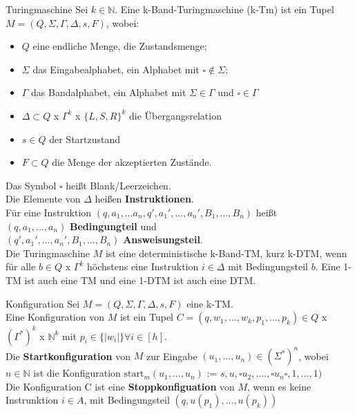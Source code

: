 \begin{defn}{Turingmaschine} 
    Sei $k \in \mathbb{N}$. Eine k-Band-Turingmaschine (k-Tm) ist ein Tupel $M = (Q, \Sigma, \Gamma, \Delta,s,F)$, wobei:
    \begin{itemize}
        \item $Q$ eine endliche Menge, die Zustandsmenge;
        \item $\Sigma$ das Eingabealphabet, ein Alphabet mit $\square \notin \Sigma$;
        \item $\Gamma$ das Bandalphabet, ein Alphabet mit $\Sigma \in \Gamma$ und $\square \in \Gamma$
        \item $\Delta \subset Q$ x $\Gamma^k$ x $\{L,S,R\}^k$ die Übergangsrelation
        \item $s \in Q$ der Startzustand
        \item $F \subset Q$ die Menge der akzeptierten Zustände.
    \end{itemize}

    \vspace{1em}

    Das Symbol $\square$ heißt Blank/Leerzeichen. \\

    Die Elemente von $\Delta$ heißen \textbf{Instruktionen}. \\
    Für eine Instruktion $(q,a_1,...a_n,q',a_1',...,a_n',B_1,...,B_n)$ heißt \\
    $(q,a_1,...,a_n)$ \textbf{Bedingungteil} und \\
    $(q',a_1',...,a_n',B_1,...,B_n)$ \textbf{Answeisungsteil}. \\

    Die Turingmaschine $M$ ist eine deterministische k-Band-TM, kurz k-DTM, wenn für alle $b \in Q$ x $\Gamma^k$ höchstens eine Instruktion $i \in \Delta$ mit Bedingungsteil $b$.
    Eine 1-TM ist auch eine TM und eine 1-DTM ist auch eine DTM.
\end{defn}

\begin{defn}{Konfiguration}
    Sei $M = (Q, \Sigma, \Gamma, \Delta, s, F)$ eine k-TM. \\

    Eine Konfiguration von $M$ ist ein Tupel $C = (q,w_1,...,w_k,p_1,...,p_k) \in Q$ x $(\Gamma^*)^k$ x $\mathbb{N}^k$ mit $p_i \in \{| w_i |\} \forall i \in [h]$. \\

    Die \textbf{Startkonfiguration} von $M$ zur Eingabe $(u_1,...,u_n)\in(\Sigma^*)^n$, wobei $n\in\mathbb{N}$ ist die Konfiguration $\text{start}_m(u_1,...,u_n)$ := $s, u,\square u_2,....,\square u_n \square, 1,...,1)$ \\

    Die Konfiguration C ist eine \textbf{Stoppkonfiguation} von $M$, wenn es keine Instrunktion $i \in A$, mit Bedingungsteil $(q, u(p_1),...,u(p_k))$
\end{defn}

